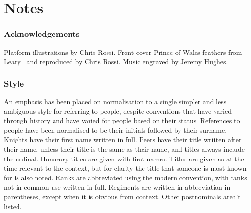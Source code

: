 \part{Notes}

\section*{Acknowledgements}

Platform illustrations by Chris Rossi. Front cover Prince of Wales feathers from Leary~\cite{leary} and reproduced by Chris Rossi. Music engraved by Jeremy Hughes.

\section*{Style}

An emphasis has been placed on normalisation to a single simpler and less ambiguous style for referring to people, despite conventions that have varied through history and have varied for people based on their status. References to people have been normalised to be their initials followed by their surname. Knights have their first name written in full. Peers have their title written after their name, unless their title is the same as their name, and titles always include the ordinal. Honorary titles are given with first names. Titles are given as at the time relevant to the context, but for clarity the title that someone is most known for is also noted. Ranks are abbreviated using the modern convention, with ranks not in common use written in full. Regiments are written in abbreviation in parentheses, except when it is obvious from context. Other postnominals aren't listed.
